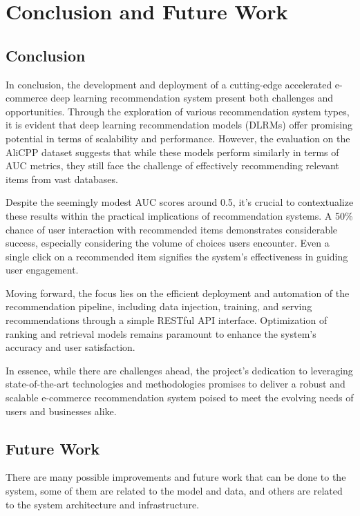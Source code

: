 \chapter{Conclusion and Future Work}
\minitoc

\section{Conclusion}
In conclusion, the development and deployment of a cutting-edge accelerated e-commerce deep learning recommendation system present both challenges and opportunities. Through the exploration of various recommendation system types, it is evident that deep learning recommendation models (DLRMs) offer promising potential in terms of scalability and performance. However, the evaluation on the AliCPP dataset suggests that while these models perform similarly in terms of AUC metrics, they still face the challenge of effectively recommending relevant items from vast databases.

Despite the seemingly modest AUC scores around 0.5, it's crucial to contextualize these results within the practical implications of recommendation systems. A 50\% chance of user interaction with recommended items demonstrates considerable success, especially considering the volume of choices users encounter. Even a single click on a recommended item signifies the system's effectiveness in guiding user engagement.

Moving forward, the focus lies on the efficient deployment and automation of the recommendation pipeline, including data injection, training, and serving recommendations through a simple RESTful API interface. Optimization of ranking and retrieval models remains paramount to enhance the system's accuracy and user satisfaction.

In essence, while there are challenges ahead, the project's dedication to leveraging state-of-the-art technologies and methodologies promises to deliver a robust and scalable e-commerce recommendation system poised to meet the evolving needs of users and businesses alike.

\section{Future Work}

There are many possible improvements and future work that can be done to the system, 
some of them are related to the model and data, and others are related to the system architecture and infrastructure.

